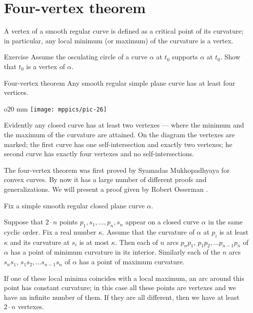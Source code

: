 \section{Four-vertex theorem}

A vertex of a smooth regular curve is defined as a critical point of its curvature;
in particular, any local minimum (or maximum) of the curvature is a vertex.

\begin{thm}{Exercise}\label{ex:vert-support}
Assume the osculating circle of a curve $\alpha$ at $t_0$ supports $\alpha$ at $t_0$.
Show that $t_0$ is a vertex of $\alpha$.
\end{thm}

\begin{thm}{Four-vertex theorem}\label{thm:4-vert}
Any smooth regular simple plane curve has at least four
vertices.
\end{thm}

\begin{wrapfigure}{o}{20 mm}
\vskip-0mm
\centering
\texttt{[image: mppics/pic-26]}
\vskip0mm
\end{wrapfigure}

Evidently any closed curve has at least two vertexes --- where the minimum and the maximum of the curvature are attained.
On the diagram the vertexes are marked;
the first curve has one self-intersection and exactly two vertexes;
he second curve has exactly four vertexes and no self-intersections.

The four-vertex theorem was first proved by Syamadas Mukhopadhyaya \cite{mukhopadhyaya} for convex curves.
By now it has a large number of different proofs and generalizations.
We will present a proof given by Robert Osserman \cite{osserman}.

Fix a simple smooth regular closed plane curve $\alpha$.

Suppose that $2\cdot n$ points $p_1,s_1,\dots,p_n,s_n$ appear on a closed curve $\alpha$ in the same cyclic order.
Fix a real number $\kappa$.
Assume that the curvature of $\alpha$ at $p_i$ is at least $\kappa$ and its curvature at $s_i$ is at most $\kappa$.
Then each of $n$ arcs $p_{n}p_1$, $p_{1}p_2, \dots p_{n-1}p_n$ of
$\alpha$ has a point of minimum curvature in its interior.
Similarly each of the $n$ arcs $s_{n}s_1$, $s_{1}s_2, \dots s_{n-1}s_n$ of
$\alpha$ has a point of maximum curvature.

If one of these local minima coincides with a local maximum,
an arc around this point has constant curvature;
in this case all these points are vertexes and we have an infinite number of them.
If they are all different, then we have at least $2\cdot n$ vertexes.


